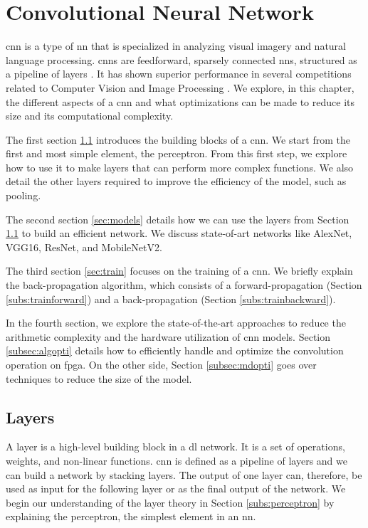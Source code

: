 \chapter{Convolutional Neural Network} \label{chap:cnn}
\acrshort{cnn} is a type of \acrshort{nn} that is specialized in analyzing visual imagery and natural language processing. \acrshort{cnn}s are feedforward, sparsely connected \acrshort{nn}s, structured as a pipeline of layers \cite{abdelouahab_accelerating_2018}. It has shown superior performance in several competitions related to Computer Vision and Image Processing \cite{khan_survey_2020}. We explore, in this chapter, the different aspects of a \acrshort{cnn} and what optimizations can be made to reduce its size and its computational complexity.

The first section \ref{sec:layer} introduces the building blocks of a \acrshort{cnn}. We start from the first and most simple element, the perceptron. From this first step, we explore how to use it to make layers that can perform more complex functions. We also detail the other layers required to improve the efficiency of the model, such as pooling.

The second section \ref{sec:models} details how we can use the layers from Section \ref{sec:layer} to build an efficient network. We discuss state-of-art networks like AlexNet, VGG16, ResNet, and MobileNetV2.

The third section \ref{sec:train} focuses on the training of a \acrshort{cnn}. We briefly explain the back-propagation algorithm, which consists of a forward-propagation (Section \ref{subs:trainforward}) and a back-propagation (Section \ref{subs:trainbackward}).

In the fourth section, we explore the state-of-the-art approaches to reduce the arithmetic complexity and the hardware utilization of \acrshort{cnn} models. Section \ref{subsec:algopti} details how to efficiently handle and optimize the convolution operation on \acrshort{fpga}. On the other side, Section \ref{subsec:mdopti} goes over techniques to reduce the size of the model.
%
%
\section{Layers} \label{sec:layer}
A layer is a high-level building block in a \acrshort{dl} network. It is a set of operations, weights, and non-linear functions. \acrshort{cnn} is defined as a pipeline of layers and we can build a network by stacking layers. The output of one layer can, therefore, be used as input for the following layer or as the final output of the network. We begin our understanding of the layer theory in Section \ref{subs:perceptron} by explaining the perceptron, the simplest element in an \acrshort{nn}.
%
%

%

%

%

%

%

%
%
